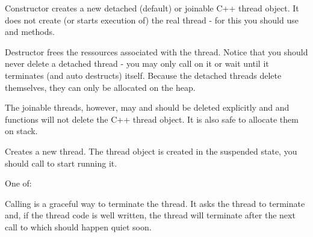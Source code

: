 \label{wxthreadctor}


Constructor creates a new detached (default) or joinable C++ thread object. It
does not create (or starts execution of) the real thread - for this you should
use  and  methods.



Destructor frees the ressources associated with the thread. Notice that you
should never delete a detached thread - you may only call 
 on it or wait until it terminates (and auto
destructs) itself. Because the detached threads delete themselves, they can
only be allocated on the heap.

The joinable threads, however, may and should be deleted explicitly and 
 and  functions
will not delete the C++ thread object. It is also safe to allocate them on
stack.

\label{wxthreadcreate}


Creates a new thread. The thread object is created in the suspended state, you
should call  to start running it.


One of:

\twocolwidtha{7cm}
\begin{twocollist}\itemsep=0pt
\end{twocollist}

\label{wxthreaddelete}


Calling  is a graceful way to terminate the
thread. It asks the thread to terminate and, if the thread code is well
written, the thread will terminate after the next call to 
 which should happen quiet soon.

